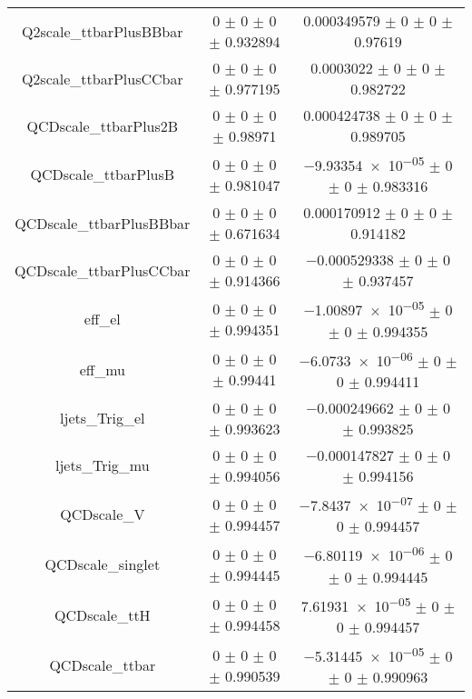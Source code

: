 \begin{table}
\begin{tabular}{ccc}
Q2scale\_ttbarPlusBBbar & \num{0} $\pm$ \num{0} $\pm$ \num{0} $\pm$ \num{0.932894} & \num{0.000349579} $\pm$ \num{0} $\pm$ \num{0} $\pm$ \num{0.97619}\\
Q2scale\_ttbarPlusCCbar & \num{0} $\pm$ \num{0} $\pm$ \num{0} $\pm$ \num{0.977195} & \num{0.0003022} $\pm$ \num{0} $\pm$ \num{0} $\pm$ \num{0.982722}\\
QCDscale\_ttbarPlus2B & \num{0} $\pm$ \num{0} $\pm$ \num{0} $\pm$ \num{0.98971} & \num{0.000424738} $\pm$ \num{0} $\pm$ \num{0} $\pm$ \num{0.989705}\\
QCDscale\_ttbarPlusB & \num{0} $\pm$ \num{0} $\pm$ \num{0} $\pm$ \num{0.981047} & \num{-9.93354e-05} $\pm$ \num{0} $\pm$ \num{0} $\pm$ \num{0.983316}\\
QCDscale\_ttbarPlusBBbar & \num{0} $\pm$ \num{0} $\pm$ \num{0} $\pm$ \num{0.671634} & \num{0.000170912} $\pm$ \num{0} $\pm$ \num{0} $\pm$ \num{0.914182}\\
QCDscale\_ttbarPlusCCbar & \num{0} $\pm$ \num{0} $\pm$ \num{0} $\pm$ \num{0.914366} & \num{-0.000529338} $\pm$ \num{0} $\pm$ \num{0} $\pm$ \num{0.937457}\\
eff\_el & \num{0} $\pm$ \num{0} $\pm$ \num{0} $\pm$ \num{0.994351} & \num{-1.00897e-05} $\pm$ \num{0} $\pm$ \num{0} $\pm$ \num{0.994355}\\
eff\_mu & \num{0} $\pm$ \num{0} $\pm$ \num{0} $\pm$ \num{0.99441} & \num{-6.0733e-06} $\pm$ \num{0} $\pm$ \num{0} $\pm$ \num{0.994411}\\
ljets\_Trig\_el & \num{0} $\pm$ \num{0} $\pm$ \num{0} $\pm$ \num{0.993623} & \num{-0.000249662} $\pm$ \num{0} $\pm$ \num{0} $\pm$ \num{0.993825}\\
ljets\_Trig\_mu & \num{0} $\pm$ \num{0} $\pm$ \num{0} $\pm$ \num{0.994056} & \num{-0.000147827} $\pm$ \num{0} $\pm$ \num{0} $\pm$ \num{0.994156}\\
QCDscale\_V & \num{0} $\pm$ \num{0} $\pm$ \num{0} $\pm$ \num{0.994457} & \num{-7.8437e-07} $\pm$ \num{0} $\pm$ \num{0} $\pm$ \num{0.994457}\\
QCDscale\_singlet & \num{0} $\pm$ \num{0} $\pm$ \num{0} $\pm$ \num{0.994445} & \num{-6.80119e-06} $\pm$ \num{0} $\pm$ \num{0} $\pm$ \num{0.994445}\\
QCDscale\_ttH & \num{0} $\pm$ \num{0} $\pm$ \num{0} $\pm$ \num{0.994458} & \num{7.61931e-05} $\pm$ \num{0} $\pm$ \num{0} $\pm$ \num{0.994457}\\
QCDscale\_ttbar & \num{0} $\pm$ \num{0} $\pm$ \num{0} $\pm$ \num{0.990539} & \num{-5.31445e-05} $\pm$ \num{0} $\pm$ \num{0} $\pm$ \num{0.990963}\\

\end{tabular}
\end{table}
